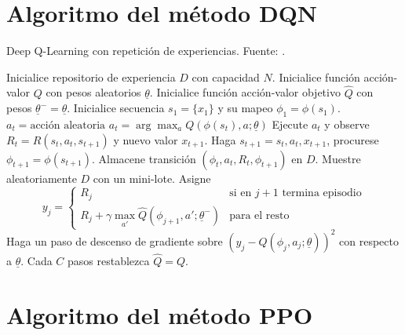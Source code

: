 \chapter{Algoritmo del método DQN}
\label{apx:apendiceDQN}

\begin{algorithm}[h]
\caption{Deep Q-Learning con repetición de experiencias. Fuente: \cite{DQNbase}.}\label{alg:DQN}
\begin{algorithmic}[1]
\State Inicialice repositorio de experiencia $D$ con capacidad $N$.
\State Inicialice función acción-valor $Q$ con pesos aleatorios $\underline{\theta}$.
\State Inicialice función acción-valor objetivo $\hat{Q}$ con pesos $\underline{\theta}^- = \underline{\theta}$.
    \State Inicialice secuencia $s_1 = \{ x_1 \}$ y su mapeo $\phi_1 = \phi(s_1)$.
            \State $a_t = \text{acción aleatoria}$
        \Else
            \State $a_t = \arg \max_a Q(\phi (s_t), a; \underline{\theta})$
        \EndIf
        \State Ejecute $a_t$ y observe $R_t = R(s_t, a_t, s_{t+1})$ y nuevo valor $x_{t+1}$.
        \State Haga $s_{t+1} = s_t, a_t, x_{t+1}$, procurese $\phi_{t+1} = \phi(s_{t+1})$.
        \State Almacene transición $(\phi_t, a_t, R_t, \phi_{t+1})$ en $D$.
        \State Muestre aleatoriamente $D$ con un mini-lote.
        \State Asigne 
        \[
        y_j = \begin{cases} 
        R_j & \text{si en $j+1$ termina episodio} \\ 
        R_j + \gamma \max_{a'} \hat{Q}(\phi_{j+1}, a'; \underline{\theta}^-) & \text{para el resto}
        \end{cases}
        \]
        \State Haga un paso de descenso de gradiente sobre $(y_j - 				Q(\phi_j, a_j; \underline{\theta}))^2$ con respecto a $					\underline{\theta}$.
        \State Cada $C$ pasos restablezca $\hat{Q} = Q$.
    \EndFor
\EndFor
\end{algorithmic}
\end{algorithm}



\chapter{Algoritmo del método PPO}
\label{apx:apendicePPO}



